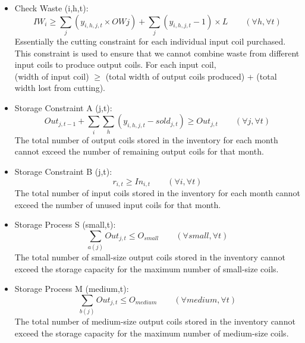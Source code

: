 \documentclass{article}[12pt]
\begin{document}
{\begin{itemize}
\item Check Waste (i,h,t):
\begin{displaymath}
IW_{i} \geq \sum_{j} (y_{i,h,j,t} \times OW{j}) + \sum_{j} (y_{i,h,j,t} - 1)\times L \qquad (\forall h, \forall t)
\end{displaymath}
Essentially the cutting constraint for each individual input coil purchased. This constraint is used to ensure that we cannot combine waste from different input coils to produce output coils. For each input coil, \\
(width of input coil) $\ge$ (total width of output coils produced) + (total width lost from cutting). \\

\item Storage Constraint A (j,t):
\begin{displaymath}
Out_{j, t-1} + \sum_{i} \sum_{h} (y_{i,h,j,t} - sold_{j,t}) \geq Out_{j,t} \qquad (\forall j, \forall t)
\end{displaymath}
The total number of output coils stored in the inventory for each month cannot exceed the number of remaining output coils for that month. \\

\item Storage Constraint B (j,t):
\begin{displaymath}
r_{i,t} \geq In_{i,t} \qquad (\forall i, \forall t)
\end{displaymath}
The total number of input coils stored in the inventory for each month cannot exceed the number of unused input coils for that month. \\

\item Storage Process S (small,t):\\
\begin{displaymath}
\sum_{a(j)} Out_{j,t} \leq O_{small} \qquad (\forall small, \forall t)
\end{displaymath}
The total number of small-size output coils stored in the inventory cannot exceed the storage capacity for the maximum number of small-size coils. \\

\item Storage Process M (medium,t):
\begin{displaymath}
\sum_{b(j)} Out_{j,t} \leq O_{medium} \qquad (\forall medium, \forall t)
\end{displaymath}
The total number of medium-size output coils stored in the inventory cannot exceed the storage capacity for the maximum number of medium-size coils. \\


\end{itemize}}
\end{document}
